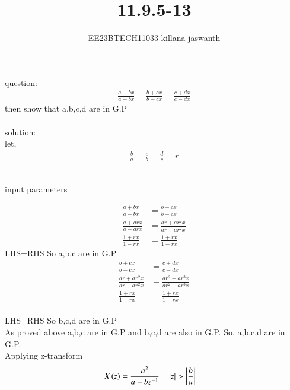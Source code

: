 \documentclass[journal,12pt,twocolumn]{IEEEtran}
\theoremstyle{remark}
\begin{document}

\vspace{3cm}

\title{11.9.5-13}
\author{EE23BTECH11033-killana jaswanth}
\maketitle
\newpage

\bigskip

\renewcommand{\thefigure}{\theenumi}
\renewcommand{\thetable}{\theenumi}
question:\begin{align}
\frac{a+bx}{a-bx}=\frac{b+cx}{b-cx}=\frac{c+dx}{c-dx}
\end{align}
then show that a,b,c,d are in G.P\\\\
solution:\\
      let,
\begin{align}
\frac{b}{a}=\frac{c}{b}=\frac{d}{c}=r
\end{align}
\\\begin{table}[!ht]
 \centering
  
   \caption{input parameters}
   \label{tab:11.9.5.13}
   \end{table}
\begin{align}
\frac{a+bx}{a-bx}&=\frac{b+cx}{b-cx}\\
\frac{a+arx}{a-arx}&=\frac{ar+ar^2x}{ar-ar^2x}\\
\frac{1+rx}{1-rx}&=\frac{1+rx}{1-rx}
\end{align}
LHS=RHS So a,b,c are in G.P 
\begin{align}
\frac{b+cx}{b-cx}&=\frac{c+dx}{c-dx}\\
\frac{ar+ar^2x}{ar-ar^2x}&=\frac{ar^2+ar^3x}{ar^2-ar^3x}\\
\frac{1+rx}{1-rx}&=\frac{1+rx}{1-rx}
\end{align}\\
LHS=RHS So b,c,d are in G.P\\
As proved above a,b,c are in G.P and b,c,d are also in G.P. So, a,b,c,d are in G.P.\\

Applying z-transform\\
\begin{align}
X\left(z\right)&=\frac{a^2}{a-bz^{-1}} \quad \left\vert z\right\vert>\left\vert\frac{b}{a}\right\vert
\end{align}
\end{document}
